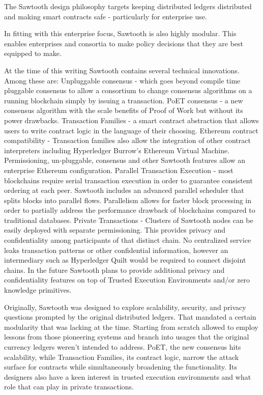 The Sawtooth design philosophy targets keeping distributed ledgers distributed and making smart contracts safe - particularly for enterprise use.

In fitting with this enterprise focus, Sawtooth is also highly modular. This enables enterprises and consortia to make policy decisions that they are best equipped to make.

At the time of this writing Sawtooth contains several technical innovations. Among these are:
Unpluggable consensus - which goes beyond compile time pluggable consensus to allow a consortium to change consensus algorithms on a running blockchain simply by issuing a transaction.
PoET consensus - a new consensus algorithm with the scale benefits of Proof of Work but without its power drawbacks.
Transaction Families - a smart contract abstraction that allows users to write contract logic in the language of their choosing.
Ethereum contract compatibility - Transaction families also allow the integration of other contract interpreters including Hyperledger Burrow's Ethereum Virtual Machine. Permissioning, un-pluggable, consensus and other Sawtooth features allow an enterprise Ethereum configuration.
Parallel Transaction Execution - most blockchains require serial transaction execution in order to guarantee consistent ordering at each peer. Sawtooth includes an advanced parallel scheduler that splits blocks into parallel flows. Parallelism allows for faster block processing in order to partially address the performance drawback of blockchains compared to traditional databases.
Private Transactions - Clusters of Sawtooth nodes can be easily deployed with separate permissioning. This provides privacy and confidentiality among participants of that distinct chain. No centralized service leaks transaction patterns or other confidential information, however an intermediary such as Hyperledger Quilt would be required to connect disjoint chains. In the future Sawtooth plans to provide additional privacy and confidentiality features on top of Trusted Execution Environments and/or zero knowledge primitives.

Originally, Sawtooth was designed to explore scalability, security, and privacy questions prompted by the original distributed ledgers. That mandated a certain modularity that was lacking at the time. Starting from scratch allowed to employ lessons from those pioneering systems and branch into usages that the original currency ledgers weren't intended to address. PoET, the new consensus hits scalability, while Transaction Families, its contract logic, narrow the attack surface for contracts while simultaneously broadening the functionality. Its designers also have a keen interest in trusted execution environments and what role that can play in private transactions.

